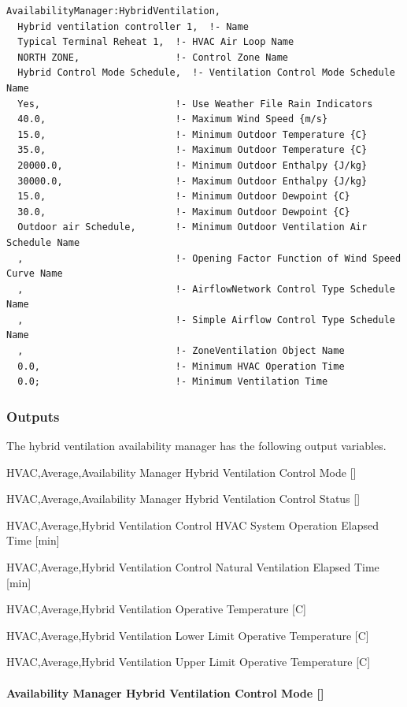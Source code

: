 \begin{lstlisting}
AvailabilityManager:HybridVentilation,
  Hybrid ventilation controller 1,  !- Name
  Typical Terminal Reheat 1,  !- HVAC Air Loop Name
  NORTH ZONE,                 !- Control Zone Name
  Hybrid Control Mode Schedule,  !- Ventilation Control Mode Schedule Name
  Yes,                        !- Use Weather File Rain Indicators
  40.0,                       !- Maximum Wind Speed {m/s}
  15.0,                       !- Minimum Outdoor Temperature {C}
  35.0,                       !- Maximum Outdoor Temperature {C}
  20000.0,                    !- Minimum Outdoor Enthalpy {J/kg}
  30000.0,                    !- Maximum Outdoor Enthalpy {J/kg}
  15.0,                       !- Minimum Outdoor Dewpoint {C}
  30.0,                       !- Maximum Outdoor Dewpoint {C}
  Outdoor air Schedule,       !- Minimum Outdoor Ventilation Air Schedule Name
  ,                           !- Opening Factor Function of Wind Speed Curve Name
  ,                           !- AirflowNetwork Control Type Schedule Name
  ,                           !- Simple Airflow Control Type Schedule Name
  ,                           !- ZoneVentilation Object Name
  0.0,                        !- Minimum HVAC Operation Time
  0.0;                        !- Minimum Ventilation Time
\end{lstlisting}

\subsubsection{Outputs}\label{outputs-9-008}

The hybrid ventilation availability manager has the following output variables.

HVAC,Average,Availability Manager Hybrid Ventilation Control Mode {[]}

HVAC,Average,Availability Manager Hybrid Ventilation Control Status {[]}

HVAC,Average,Hybrid Ventilation Control HVAC System Operation Elapsed Time {[min]}

HVAC,Average,Hybrid Ventilation Control Natural Ventilation Elapsed Time {[min]}

HVAC,Average,Hybrid Ventilation Operative Temperature {[C]}

HVAC,Average,Hybrid Ventilation Lower Limit Operative Temperature {[C]}

HVAC,Average,Hybrid Ventilation Upper Limit Operative Temperature {[C]}

\paragraph{Availability Manager Hybrid Ventilation Control Mode {[]}}\label{availability-manager-hybrid-ventilation-control-mode}

